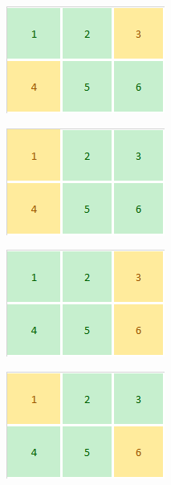 \documentclass[12pt,leqno]{article}
\theoremstyle{theoremdd}
\begin{document}
\begin{figure}[ht]
    \caption{משחק על גרף לדוגמה}
    \label{fig:all-2x3-sol}
    \centering
    \begin{subfigure}{.20\textwidth}
        \centering
        \includegraphics{images/min_sol_2x3.PNG}
    \end{subfigure}%
    \begin{subfigure}{.20\textwidth}
        \centering
        \includegraphics{images/2x3_2.png}
    \end{subfigure}%
    \begin{subfigure}{.20\textwidth}
        \centering
        \includegraphics{images/2x3_3.png}
    \end{subfigure}%
    \begin{subfigure}{.20\textwidth}
        \centering
        \includegraphics{images/2x3_4.png}
    \end{subfigure}%
\end{figure}
\end{document}
